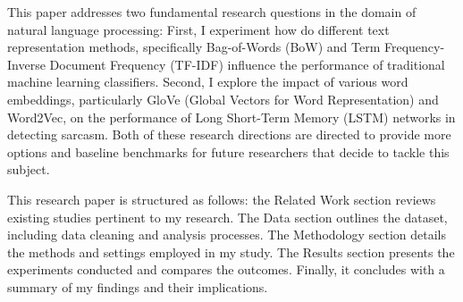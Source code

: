 This paper addresses two fundamental research questions in the domain of natural language processing: First, I experiment how do different text representation methods, 
specifically Bag-of-Words (BoW) and Term Frequency-Inverse Document Frequency (TF-IDF) influence the performance of traditional machine learning classifiers. 
Second, I explore the impact of various word embeddings, particularly GloVe (Global Vectors for Word Representation) and Word2Vec, on the performance of Long Short-Term Memory (LSTM) 
networks in detecting sarcasm. Both of these research directions are directed to provide more options and baseline benchmarks for future researchers that decide to tackle this subject.

This research paper is structured as follows: the Related Work section reviews existing studies pertinent to my research. The Data section outlines the dataset, including data cleaning and 
analysis processes. The Methodology section details the methods and settings employed in my study. The Results section presents the experiments conducted and compares the outcomes. 
Finally, it concludes with a summary of my findings and their implications.
